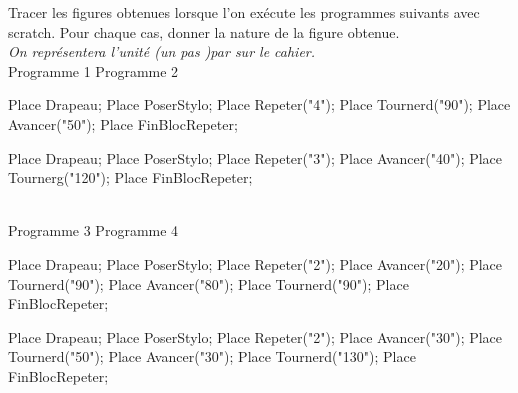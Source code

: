 \begin{exercice}
    Tracer les figures obtenues lorsque l'on exécute les programmes suivants avec scratch. Pour chaque cas, donner la nature de la figure obtenue. \\
    {\it On représentera l'unité (un pas )par  sur le cahier.} \\ [2mm]
          Programme 1 \hspace*{2.2cm} Programme 2 \\ [1mm]
          \begin{Scratch}[Echelle=0.7]
             Place Drapeau;
             Place PoserStylo;
             Place Repeter("4");
                Place Tournerd("90");
                Place Avancer("50");
             Place FinBlocRepeter;
          \end{Scratch}
          \qquad
          \begin{Scratch}[Echelle=0.7]
             Place Drapeau;
             Place PoserStylo;
             Place Repeter("3");
                Place Avancer("40");
                Place Tournerg("120");
             Place FinBlocRepeter;
          \end{Scratch}
          \\ [3mm]
          Programme 3 \hspace*{2.2cm} Programme 4 \\ [1mm]
          \begin{Scratch}[Echelle=0.7]
             Place Drapeau;
             Place PoserStylo;
             Place Repeter("2");
                Place Avancer("20");
                Place Tournerd("90");
                Place Avancer("80");
                Place Tournerd("90");
             Place FinBlocRepeter;
          \end{Scratch} 
          \qquad
          \begin{Scratch}[Echelle=0.7]
             Place Drapeau;
             Place PoserStylo;
             Place Repeter("2");
                Place Avancer("30");
                Place Tournerd("50");
                Place Avancer("30");
                Place Tournerd("130");
             Place FinBlocRepeter;
          \end{Scratch}

          
 \end{exercice}
 

